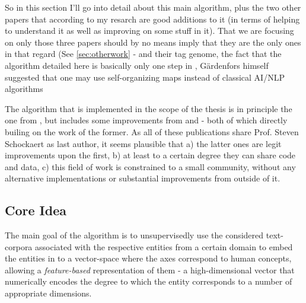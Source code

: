 


So in this section I'll go into detail about this main algorithm, plus the two other papers that according to my resarch are good additions to it (in terms of helping to understand it as well as improving on some stuff in it). That we are focusing on only those three papers should by no means imply that they are the only ones in that regard (See \autoref{sec:otherwork} - \cite{VISR12} and their tag genome, the fact that the algorithm detailed here is basically only one step in \cite{Alshaikh2019}, Gärdenfors himself suggested that one may use self-organizing maps instead of classical AI/NLP algorithms


The algorithm that is implemented in the scope of the thesis is in principle the one from \textcite{Derrac2015}, but includes some improvements from \textcite{Ager2018} and \textcite{Alshaikh2020} - both of which directly builing on the work of the former. As all of these publications share Prof. Steven Schockaert as last author, it seems plausible that a) the latter ones are legit improvements upon the first, b) at least to a certain degree they can share code and data, c) this field of work is constrained to a small community, without any alternative implementations or substantial improvements from outside of it.

\subsection{Core Idea}

The main goal of the algorithm is to unsupervisedly use the considered text-corpora associated with the respective entities from a certain domain %
to embed the entities in to a vector-space where the axes correspond to human concepts, %
allowing a \textit{feature-based} representation of them - a high-dimensional vector that numerically encodes the degree %
to which the entity corresponds to a number of appropriate dimensions. %
\newline


